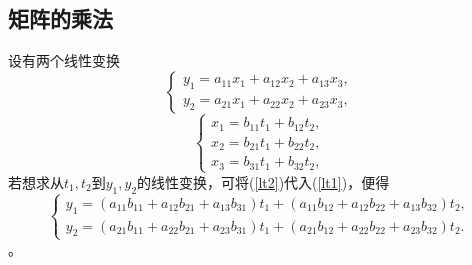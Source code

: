 \subsection{矩阵的乘法}
\begin{frame}
  \begin{footnotesize}
    设有两个线性变换
    \begin{equation}\label{lt1}
      \left\{
        \begin{array}{l}
          y_1 = a_{11} x_1 + a_{12} x_2 + a_{13} x_3, \\[0.2cm]
          y_2 = a_{21} x_1 + a_{22} x_2 + a_{23} x_3,
        \end{array}
      \right.
    \end{equation}
    \pause
    \begin{equation}\label{lt2}
      \left\{
        \begin{array}{l}
          x_1 = b_{11} t_1 + b_{12} t_2 , \\[0.2cm]
          x_2 = b_{21} t_1 + b_{22} t_2 , \\[0.2cm]
          x_3 = b_{31} t_1 + b_{32} t_2 , 
        \end{array}
      \right.
    \end{equation}
    \pause
    若想求从$t_1, t_2$到$y_1, y_2$的线性变换，可将(\ref{lt2})代入(\ref{lt1})，便得
    \begin{equation}\label{lt3}
      \left\{
        \begin{array}{l}
          y_1 = (a_{11}b_{11} + a_{12}b_{21} + a_{13}b_{31}) t_1 + (a_{11}b_{12} + a_{12}b_{22} + a_{13}b_{32})t_2, \\[0.2cm]
          y_2 = (a_{21}b_{11} + a_{22}b_{21} + a_{23}b_{31}) t_1 + (a_{21}b_{12} + a_{22}b_{22} + a_{23}b_{32})t_2.
        \end{array}
      \right.
    \end{equation}
    \pause
    。
  \end{footnotesize}
\end{frame}

